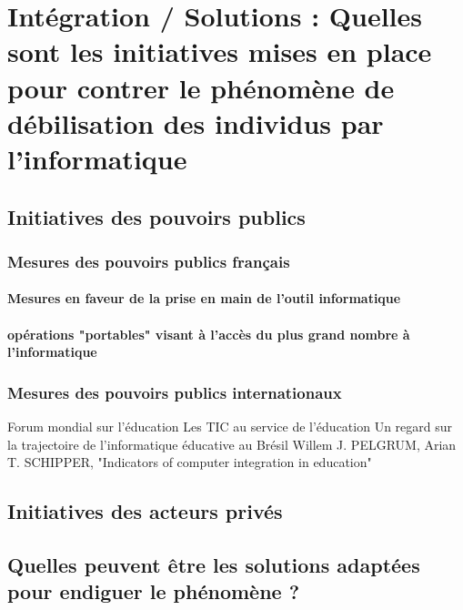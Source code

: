 
\chapter{Intégration / Solutions : Quelles sont les initiatives mises en place pour contrer le phénomène de débilisation des individus par l'informatique}\label{initiatives_actuelles}

\section{Initiatives des pouvoirs publics}

\subsection{Mesures des pouvoirs publics français}
\subsubsection{Mesures en faveur de la prise en main de l'outil informatique}
\cite{b2i_c2i}
\cite{b2i}
\cite{isn}

\subsubsection{opérations "portables" visant à l'accès du plus grand nombre à l'informatique}
\cite{portables35}
\cite{portables60}
\cite{portables40}

    


\subsection{Mesures des pouvoirs publics internationaux}
Forum mondial sur l’éducation \cite{educ_forum}
Les TIC au service de l’éducation \cite{tics}
Un regard sur la trajectoire de l’informatique éducative au Brésil \cite{peixoto2006regard}
Willem J. PELGRUM, Arian T. SCHIPPER, "Indicators of computer integration in education" \cite{pelgrum1993indicators}



\section{Initiatives des acteurs privés}



\section{Quelles peuvent être les solutions adaptées pour endiguer le phénomène ?}\label{solutions}

